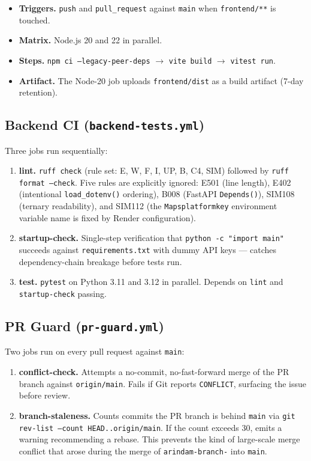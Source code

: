 \documentclass[11pt, a4paper]{article}
\newcommand{\code}[1]{\texttt{\small#1}}
\begin{document}
\begin{itemize}[leftmargin=*, itemsep=2pt, topsep=2pt]
  \item \textbf{Triggers.} \code{push} and \code{pull\_request} against \code{main} when \code{frontend/**} is touched.
  \item \textbf{Matrix.} Node.js 20 and 22 in parallel.
  \item \textbf{Steps.} \code{npm ci --legacy-peer-deps} $\rightarrow$ \code{vite build} $\rightarrow$ \code{vitest run}.
  \item \textbf{Artifact.} The Node-20 job uploads \code{frontend/dist} as a build artifact (7-day retention).
\end{itemize}

\subsection{Backend CI (\texttt{backend-tests.yml})}

Three jobs run sequentially:

\begin{enumerate}[leftmargin=*, itemsep=2pt, topsep=2pt]
  \item \textbf{lint.} \code{ruff check} (rule set: E, W, F, I, UP, B, C4, SIM) followed by \code{ruff format --check}. Five rules are explicitly ignored: E501 (line length), E402 (intentional \code{load\_dotenv()} ordering), B008 (FastAPI \code{Depends()}), SIM108 (ternary readability), and SIM112 (the \code{Mapsplatformkey} environment variable name is fixed by Render configuration).
  \item \textbf{startup-check.} Single-step verification that \code{python -c "import main"} succeeds against \code{requirements.txt} with dummy API keys --- catches dependency-chain breakage before tests run.
  \item \textbf{test.} \code{pytest} on Python 3.11 and 3.12 in parallel. Depends on \code{lint} and \code{startup-check} passing.
\end{enumerate}

\subsection{PR Guard (\texttt{pr-guard.yml})}

Two jobs run on every pull request against \code{main}:

\begin{enumerate}[leftmargin=*, itemsep=2pt, topsep=2pt]
  \item \textbf{conflict-check.} Attempts a no-commit, no-fast-forward merge of the PR branch against \code{origin/main}. Fails if Git reports \code{CONFLICT}, surfacing the issue before review.
  \item \textbf{branch-staleness.} Counts commits the PR branch is behind \code{main} via \code{git rev-list --count HEAD..origin/main}. If the count exceeds 30, emits a warning recommending a rebase. This prevents the kind of large-scale merge conflict that arose during the merge of \code{arindam-branch-} into \code{main}.
\end{enumerate}
\end{document}
